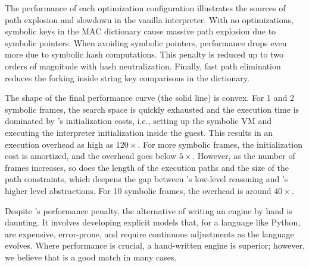 
The performance of each optimization configuration illustrates the sources of path explosion and slowdown in the vanilla interpreter.  With no optimizations, symbolic keys in the MAC dictionary cause massive path explosion due to symbolic pointers.  When avoiding symbolic pointers, performance drops even more due to symbolic hash computations.  This penalty is reduced up to two orders of magnitude with hash neutralization.  Finally, fast path elimination reduces the forking inside string key comparisons in the dictionary.

The shape of the final performance curve (the solid line) is convex.  For 1 and 2 symbolic frames, the search space is quickly exhausted and the execution time is dominated by \chef's initialization costs, i.e., setting up the symbolic VM and executing the interpreter initialization inside the guest.  This results in an execution overhead as high as $120 \times$.  For more symbolic frames, the initialization cost is amortized, and the overhead goes below $5 \times$.  However, as the number of frames increases, so does the length of the execution paths and the size of the path constraints, which deepens the gap between \chef's low-level reasoning and \nicese's higher level abstractions.  For 10 symbolic frames, the overhead is around $40 \times$.

Despite \chef's performance penalty, the alternative of writing an engine by hand is daunting. It involves developing explicit models that, for a language like Python, are expensive, error-prone, and require continuous adjustments as the language evolves.
%
Where performance is crucial, a hand-written engine is superior; however, we believe that \chef is a good match in many cases.

